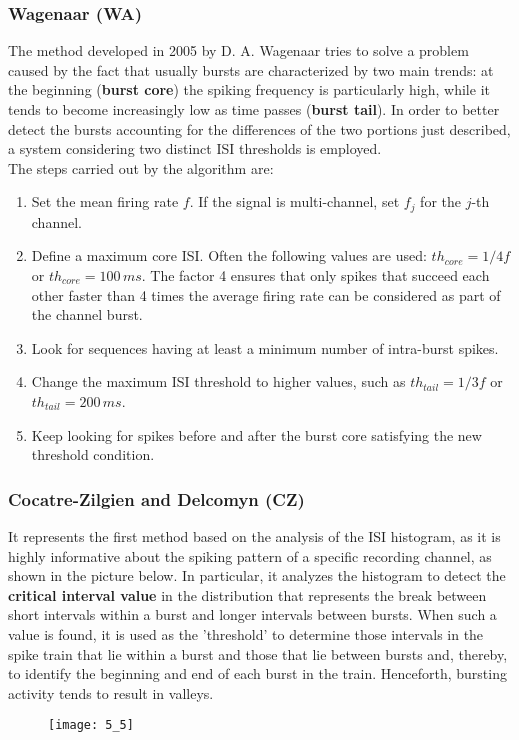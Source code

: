 \subsubsection{Wagenaar (WA)}
The method developed in 2005 by D. A. Wagenaar tries to solve a problem caused by the fact
that usually bursts are characterized by two main trends: at the beginning
(\textbf{burst core}) the spiking frequency is particularly high, while it tends to become
increasingly low as time passes (\textbf{burst tail}). In order to better detect the bursts
accounting for the differences of the two portions just described, a system considering two
distinct ISI thresholds is employed.\\
The steps carried out by the algorithm are:
\begin{enumerate}
    \item Set the mean firing rate \(f\). If the signal is multi-channel, set \(f_j\) for
          the \(j\)-th channel.
    \item Define a maximum core ISI. Often the following values are used:
          \(th_{core}=1/4f\) or \(th_{core}=100\,ms\). The factor 4 ensures that only spikes that
          succeed each other faster than 4 times the average firing rate can be considered as
          part of the channel burst.
    \item Look for sequences having at least a minimum number of intra-burst spikes.
    \item Change the maximum ISI threshold to higher values, such as \(th_{tail}=1/3f\) or
          \(th_{tail}=200\,ms\).
    \item Keep looking for spikes before and after the burst core satisfying the
          new threshold condition.
\end{enumerate}
\subsubsection{Cocatre-Zilgien and Delcomyn (CZ)}
It represents the first method based on the analysis of the ISI histogram, as it is highly
informative about the spiking pattern of a specific recording channel, as shown in the
picture below. In particular, it analyzes the histogram to detect the
\textbf{critical interval value} in the distribution that represents the break between short
intervals within a burst and longer intervals between bursts. When such a value is found,
it is used as the 'threshold' to determine those intervals in the spike train that lie
within a burst and those that lie between bursts and, thereby, to identify the beginning
and end of each burst in the train. Henceforth, bursting activity tends to result in valleys.
\begin{figure}[H]
    \texttt{[image: 5\_5]}
    \centering
\end{figure}

